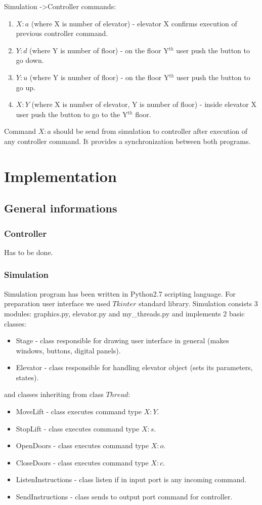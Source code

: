 \documentclass[12pt]{article}
\begin{document}
Simulation -\textgreater Controller commands:
\begin{enumerate}
	\item $X:a$ (where X is number of elevator) - elevator X confirms execution of previous controller command.
	\item $Y:d$ (where Y is number of floor) - on the floor Y$^{th}$ user push the button to go down.
	\item $Y:u$ (where Y is number of floor) - on the floor Y$^{th}$ user push the button to go up.
	\item $X:Y$ (where X is number of elevator, Y is number of floor) - inside elevator X user push the button to go to the Y$^{th}$ floor.
\end{enumerate}	

Command $X:a$ should be send from simulation to controller after execution of any controller command. It provides a synchronization between both programs.
\newline
\newline

\section{Implementation}
\subsection{General informations}
\subsubsection{Controller}
Has to be done.
\subsubsection{Simulation}
Simulation program has been written in Python2.7 scripting language. For preparation user interface we used $Tkinter$ standard library. 
Simulation consists 3 modules: graphics.py, elevator.py and my{\_}threads.py and implements 2 basic classes:  
\begin{itemize}
 \item Stage - class responsible for drawing user interface in general (makes windows, buttons, digital panels).
 \item Elevator - class responsible for handling elevator object (sets its parameters, states). 
\end{itemize}
and classes inheriting from class $Thread$:
\begin{itemize}
 \item MoveLift - class executes command type $X:Y$.
 \item StopLift - class executes command type $X:s$.
 \item OpenDoors - class executes command type $X:o$.
 \item CloseDoors - class executes command type $X:c$.
 \item ListenInstructions - class listen if in input port is any incoming command.
 \item SendInstructions - class sends to output port command for controller.
\end{itemize}
\end{document}
